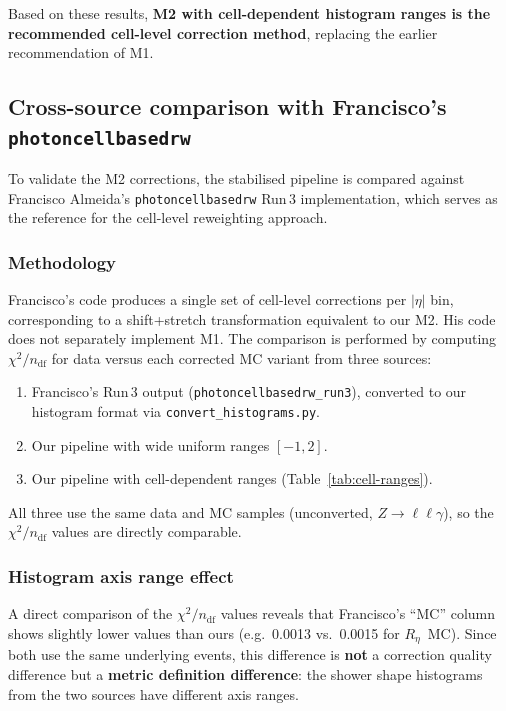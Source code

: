 \documentclass[11pt,a4paper]{article}
\newcommand{\Reta}{\ensuremath{R_{\eta}}}
\newcommand{\abseta}{\ensuremath{|\eta|}}
\newcommand{\chisq}{\ensuremath{\chi^2 / n_{\mathrm{df}}}}
\begin{document}
Based on these results, \textbf{M2 with cell-dependent histogram ranges
is the recommended cell-level correction method}, replacing the earlier
recommendation of M1.


\subsection{Cross-source comparison with Francisco's \texttt{photoncellbasedrw}}
\label{sec:disc-francisco}

To validate the M2 corrections, the stabilised pipeline is compared
against Francisco Almeida's \texttt{photoncellbasedrw} Run\,3
implementation, which serves as the reference for the cell-level
reweighting approach.

\subsubsection{Methodology}

Francisco's code produces a single set of cell-level corrections
per $\abseta$ bin, corresponding to a shift+stretch transformation
equivalent to our M2.  His code does not separately implement M1.
The comparison is performed by computing $\chisq$ for data versus
each corrected MC variant from three sources:
\begin{enumerate}
  \item Francisco's Run\,3 output (\texttt{photoncellbasedrw\_run3}),
        converted to our histogram format via
        \texttt{convert\_histograms.py}.
  \item Our pipeline with wide uniform ranges $[-1, 2]$.
  \item Our pipeline with cell-dependent ranges
        (Table~\ref{tab:cell-ranges}).
\end{enumerate}
All three use the same data and MC samples (unconverted,
$Z \to \ell\ell\gamma$), so the $\chisq$ values are directly
comparable.

\subsubsection{Histogram axis range effect}
\label{sec:disc-range-effect}

A direct comparison of the $\chisq$ values reveals that Francisco's
``MC'' column shows slightly lower values than ours (e.g.\ 0.0013 vs.\
0.0015 for \Reta\ MC).  Since both use the same underlying events, this
difference is \textbf{not} a correction quality difference but a
\textbf{metric definition difference}: the shower shape histograms from
the two sources have different axis ranges.
\end{document}
